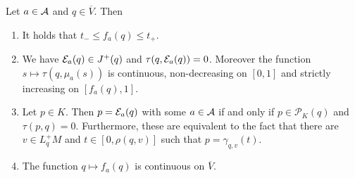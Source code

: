 \begin{lemma}\label{lem:observationtime}
Let $a\in \mathcal{A}$ and $q \in \overline{V}$. Then
\begin{enumerate}[label={\textnormal{(\arabic*)}}]
    \item It holds that $t_-\leq f_a(q) \leq t_+$.
    \item We have $\mathcal{E}_a(q)\in J^+(q)$ and $\tau(q,\mathcal{E}_a(q))=0$. Moreover the function $s\mapsto\tau(q,\mu_a(s))$ is continuous, non-decreasing on $[0,1]$ and strictly increasing on $[f_a(q),1]$.
    \item Let $p\in K$. Then $p=\mathcal{E}_a(q)$ with some $a\in \mathcal{A}$ if and only if $p\in \mathcal{P}_K(q)$ and $\tau(p,q)=0$. Furthermore, these are equivalent to the fact that there are $v\in L^+_qM$ and $t\in[0,\rho(q,v)]$ such that $p=\gamma_{q,v}(t)$.
    \item The function $q\mapsto f_a(q)$ is continuous on $\overline{V}$.
\end{enumerate}
\end{lemma}
